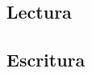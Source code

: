 \documentclass{article}
\begin{document}
\subsection{Lectura}

\subsection{Escritura}
\end{document}
